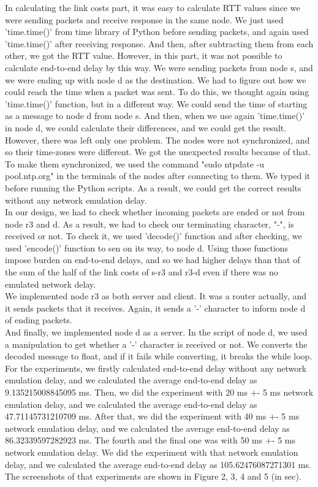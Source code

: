\documentclass[conference]{IEEEtran}
\begin{document}
In calculating the link costs part, it was easy to calculate RTT values since we were sending packets and receive response in the same node. We just used 'time.time()' from time library of Python before sending packets, and again used 'time.time()' after receiving response. And then, after subtracting them from each other, we got the RTT value. However, in this part, it was not possible to calculate end-to-end delay by this way. We were sending packets from node s, and we were ending up with node d as the destination. We had to figure out how we could reach the time when a packet was sent. To do this, we thought again using 'time.time()' function, but in a different way. We could send the time of starting as a message to node d from node s. And then, when we use again 'time.time()' in node d, we could calculate their differences, and we could get the result. However, there was left only one problem. The nodes were not synchronized, and so their time-zones were different. We got the unexpected results because of that. To make them synchronized, we used the command "sudo ntpdate -u pool.ntp.org" in the terminals of the nodes after connecting to them. We typed it before running the Python scripts. As a result, we could get the correct results without any network emulation delay. \\

In our design, we had to check whether incoming packets are ended or not from node r3 and d. As a result, we had to check our terminating character, "-", is received or not. To check it, we used 'decode()' function and after checking, we used 'encode()' function to sen on its way, to node d. Using those functions impose burden on end-to-end delays, and so we had higher delays than that of the sum of the half of the link costs of s-r3 and r3-d even if there was no emulated network delay. \\ 
We implemented node r3 as both server and client. It was a router actually, and it sends packets that it receives. Again, it sends a '-' character to inform node d of ending packets. \\

And finally, we implemented node d as a server. In the script of node d, we used a manipulation to get whether a '-' character is received or not. We converts the decoded message to float, and if it fails while converting, it breaks the while loop. \\

For the experiments, we firstly calculated end-to-end delay without any network emulation delay, and we calculated the average end-to-end delay as 9.135215008845095 ms. Then, we did the experiment with 20 ms +- 5 ms network emulation delay, and we calculated the average end-to-end delay as 47.71145731210709 ms. After that, we did the experiment with 40 ms +- 5 ms network emulation delay, and we calculated the average end-to-end delay as  86.32339597282923 ms. The fourth and the final one was with 50 ms +- 5 ms network emulation delay. We did the experiment with that network emulation delay, and we calculated the average end-to-end delay as 105.62476087271301 ms. The screenshots of that experiments are shown in Figure 2, 3, 4 and 5 (in sec). \\ 
\end{document}
